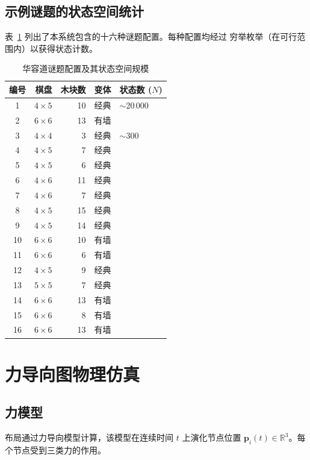 \documentclass[11pt,a4paper]{report}
\begin{document}
\section{示例谜题的状态空间统计}
\label{sec:puzzle-stats}
表~\ref{tab:puzzles} 列出了本系统包含的十六种谜题配置。每种配置均经过
穷举枚举（在可行范围内）以获得状态计数。
\begin{table}[htbp]
\centering
\caption{华容道谜题配置及其状态空间规模}
\label{tab:puzzles}
\begin{tabular}{crrcl}
\toprule
\textbf{编号} & \textbf{棋盘} & \textbf{木块数} & \textbf{变体} & \textbf{状态数 ($N$)} \\
\midrule
1  & $4 \times 5$ & 10 & 经典 & $\sim$20\,000 \\
2  & $6 \times 6$ & 13 & 有墙 & \\
3  & $4 \times 4$ & 3  & 经典 & $\sim$300 \\
4  & $4 \times 5$ & 7  & 经典 & \\
5  & $4 \times 5$ & 6  & 经典 & \\
6  & $4 \times 6$ & 11 & 经典 & \\
7  & $4 \times 6$ & 7  & 经典 & \\
8  & $4 \times 5$ & 15 & 经典 & \\
9  & $4 \times 5$ & 14 & 经典 & \\
10 & $6 \times 6$ & 10 & 有墙 & \\
11 & $6 \times 6$ & 6  & 有墙 & \\
12 & $4 \times 5$ & 9  & 经典 & \\
13 & $5 \times 5$ & 7  & 经典 & \\
14 & $6 \times 6$ & 13 & 有墙 & \\
15 & $6 \times 6$ & 8  & 有墙 & \\
16 & $6 \times 6$ & 13 & 有墙 & \\
\bottomrule
\end{tabular}
\end{table}
\chapter{力导向图物理仿真}
\label{ch:physics}
\section{力模型}
\label{sec:force-model}
布局通过力导向模型计算，该模型在连续时间 $t$ 上演化节点位置
$\mathbf{p}_i(t) \in \mathbb{R}^3$。每个节点受到三类力的作用。
\end{document}
